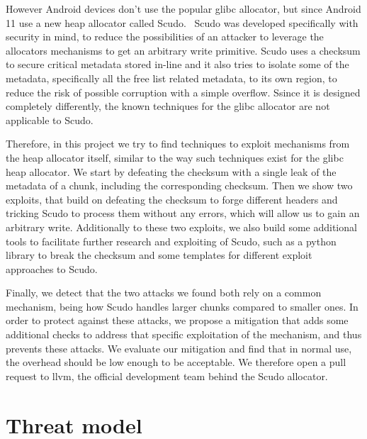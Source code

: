 \documentclass[a4paper,11pt,oneside]{report}
\begin{document}
However Android devices don't use the popular glibc allocator, but since Android 11 use a
new heap allocator called Scudo.~\cite{llvmScudo} Scudo was developed specifically with security in mind,
to reduce the possibilities of an attacker to leverage the allocators mechanisms to get an
arbitrary write primitive. Scudo uses a checksum to secure critical
metadata stored in-line and it also tries to isolate some of the metadata, specifically all the free list
related metadata, to its own region, to reduce the risk of possible corruption with a
simple overflow. Ssince it is designed completely differently, the known techniques
for the glibc allocator are not applicable to Scudo.

Therefore, in this project we try to find techniques to exploit mechanisms from the heap
allocator itself, similar to the way such techniques exist for the glibc heap
allocator. We start by defeating the checksum with a single leak of the metadata of a
chunk, including the corresponding checksum. Then we show two exploits, that build on
defeating the checksum to forge different headers and tricking Scudo to process them
without any errors, which will allow us to gain an arbitrary write. Additionally to these
two exploits, we also build some additional tools to facilitate further research and
exploiting of Scudo, such as a python library to break the checksum and some templates for
different exploit approaches to Scudo.

Finally, we detect that the two attacks we found both rely on a common mechanism, being how
Scudo handles larger chunks compared to smaller ones. In order to protect against these
attacks, we propose a mitigation that adds some additional checks to address that specific
exploitation of the mechanism, and thus prevents these attacks. We evaluate our mitigation
and find that  in normal use, the overhead should be low enough to be acceptable. We
therefore open a pull request to llvm, the official development team behind the Scudo
allocator.

\chapter{Threat model}
\end{document}
